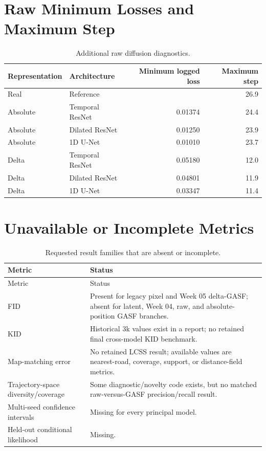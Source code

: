 \documentclass[12pt,a4paper,oneside]{report}
\newcommand{\NA}{\textemdash}
\begin{document}
\section{Raw Minimum Losses and Maximum Step}

\begin{table}[htbp]
\centering
\caption{Additional raw diffusion diagnostics.}
\label{tab:raw-additional}
\begin{tabular}{llrr}
\toprule
Representation & Architecture & Minimum logged loss & Maximum step \\
\midrule
Real & Reference & \NA & 26.9 \\
Absolute & Temporal ResNet & 0.01374 & 24.4 \\
Absolute & Dilated ResNet & 0.01250 & 23.9 \\
Absolute & 1D U-Net & 0.01010 & 23.7 \\
Delta & Temporal ResNet & 0.05180 & 12.0 \\
Delta & Dilated ResNet & 0.04801 & 11.9 \\
Delta & 1D U-Net & 0.03347 & 11.4 \\
\bottomrule
\end{tabular}
\end{table}

\section{Unavailable or Incomplete Metrics}

\begin{longtable}{L{0.30\textwidth}L{0.63\textwidth}}
\caption{Requested result families that are absent or incomplete.}\label{tab:missing-results}\\
\toprule
Metric & Status \\
\midrule
\endfirsthead
\toprule
Metric & Status \\
\midrule
\endhead
FID & Present for legacy pixel and Week 05 delta-GASF; absent for latent, Week 04, raw, and absolute-position GASF branches. \\
KID & Historical 3k values exist in a report; no retained final cross-model KID benchmark. \\
Map-matching error & No retained LCSS result; available values are nearest-road, coverage, support, or distance-field metrics. \\
Trajectory-space diversity/coverage & Some diagnostic/novelty code exists, but no matched raw-versus-GASF precision/recall result. \\
Multi-seed confidence intervals & Missing for every principal model. \\
Held-out conditional likelihood & Missing. \\
\bottomrule
\end{longtable}
\end{document}
